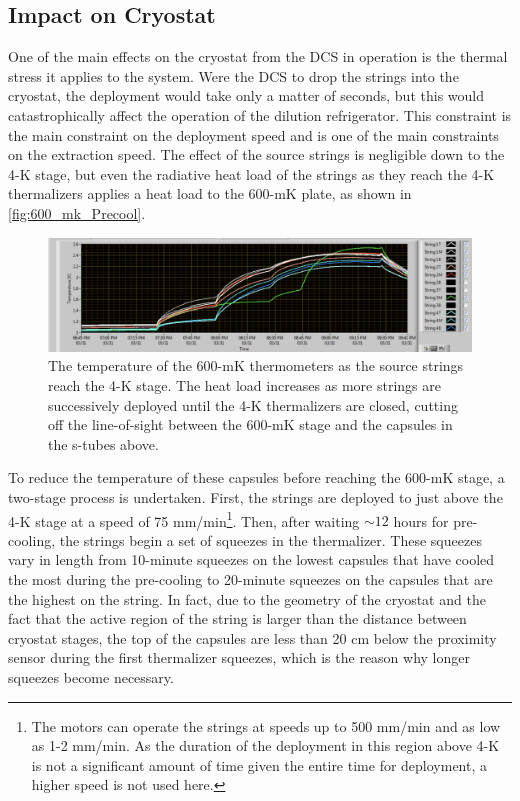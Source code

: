 \subsection*{Impact on Cryostat}
One of the main effects on the cryostat from the DCS in operation is the thermal stress it applies to the system.
Were the DCS to drop the strings into the cryostat, the deployment would take only a matter of seconds, but this would catastrophically affect the operation of the dilution refrigerator.
This constraint is the main constraint on the deployment speed and is one of the main constraints on the extraction speed.
The effect of the source strings is negligible down to the 4-K stage, but even the radiative heat load of the strings as they reach the 4-K thermalizers applies a heat load to the 600-mK plate, as shown in \autoref{fig:600_mk_Precool}.
\begin{figure}
    \centering
    \includegraphics[width=0.8\linewidth]{Figures/600mK_temperature_during_precool.png}
    \caption[The temperature of the 600-mK thermometers as the source strings reach the 4-K stage.]
    {The temperature of the 600-mK thermometers as the source strings reach the 4-K stage.
    The heat load increases as more strings are successively deployed until the 4-K thermalizers are closed, cutting off the line-of-sight between the 600-mK stage and the capsules in the s-tubes above.}
    \label{fig:600_mk_Precool}
\end{figure}
To reduce the temperature of these capsules before reaching the 600-mK stage, a two-stage process is undertaken.
First, the strings are deployed to just above the 4-K stage at a speed of 75 mm/min\footnote{The motors can operate the strings at speeds up to 500 mm/min and as low as 1-2 mm/min.
As the duration of the deployment in this region above 4-K is not a significant amount of time given the entire time for deployment, a higher speed is not used here.}.
Then, after waiting $\sim12$ hours for pre-cooling, the strings begin a set of squeezes in the thermalizer.
These squeezes vary in length from 10-minute squeezes on the lowest capsules that have cooled the most during the pre-cooling to 20-minute squeezes on the capsules that are the highest on the string.
In fact, due to the geometry of the cryostat and the fact that the active region of the string is larger than the distance between cryostat stages, the top of the capsules are less than 20 cm below the proximity sensor during the first thermalizer squeezes, which is the reason why longer squeezes become necessary.
